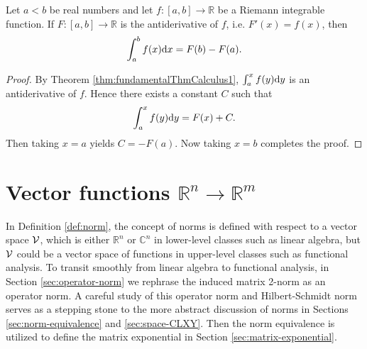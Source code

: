\begin{thm}
  \label{thm:fundamentalThmCalculus2}
  Let $a<b$ be real numbers
  and let $f: [a,b]\rightarrow \mathbb{R}$
  be a Riemann integrable function.
  If $F:[a,b]\rightarrow\mathbb{R}$ is the antiderivative of $f$,
  i.e. $F'(x)=f(x)$,
  then
  \begin{equation}
    \label{eq:fundamentalThmCalculus2}
    \int_a^b f(x)\mathrm{d} x = F(b) - F(a).
  \end{equation}
\end{thm}
\begin{proof}
  By Theorem \ref{thm:fundamentalThmCalculus1},
  $\int_{a}^{x}f(y)\mathrm{d} y$ is an antiderivative of $f$.
  Hence there exists a constant $C$ such that
  \begin{displaymath}
    \int_{a}^{x}f(y)\mathrm{d} y = F(x)+C.
  \end{displaymath}
  Then taking $x=a$ yields $C=-F(a)$.
  Now taking $x=b$ completes the proof.
\end{proof}


\section{Vector functions
  $\mathbb{R}^n\rightarrow\mathbb{R}^m$}
\label{sec:sever-vari-diff}

\begin{rem} 
  In Definition \ref{def:norm},
  the concept of norms is defined with respect
  to a vector space ${\cal V}$,
  which is either $\mathbb{R}^n$ or $\mathbb{C}^n$
  in lower-level classes such as linear algebra,
  but ${\cal V}$ could be a vector space of functions
  in upper-level classes such as
  functional analysis.
  To transit smoothly from linear algebra
  to functional analysis,
  in Section \ref{sec:operator-norm}
  we rephrase the induced matrix 2-norm
  as an operator norm.
  A careful study of this operator norm
  and Hilbert-Schmidt norm
  serves as a stepping stone
  to the more abstract discussion of norms
  in Sections \ref{sec:norm-equivalence}
  and \ref{sec:space-CLXY}.
  Then the norm equivalence is utilized
  to define the matrix exponential
  in Section \ref{sec:matrix-exponential}.
\end{rem}

